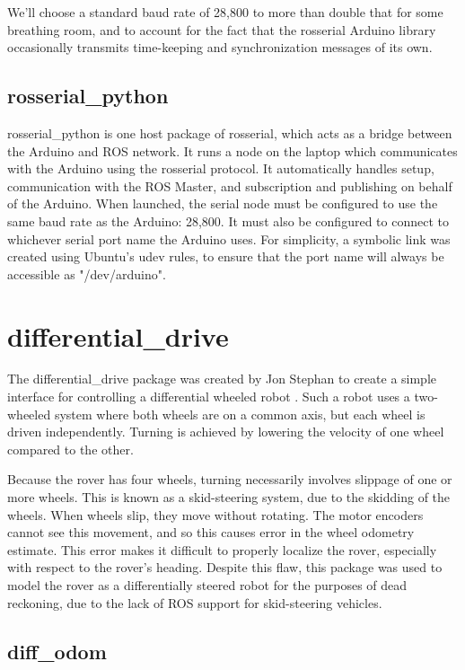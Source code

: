 We'll choose a standard baud rate of 28,800 to more than double that for some breathing room, and to account for the fact that the rosserial Arduino library occasionally transmits time-keeping and synchronization messages of its own.

\subsection{rosserial\_python}
rosserial\_python is one host package of rosserial, which acts as a bridge between the Arduino and ROS network. It runs a node on the laptop which communicates with the Arduino using the rosserial protocol. It automatically handles setup, communication with the ROS Master, and subscription and publishing on behalf of the Arduino. When launched, the serial node must be configured to use the same baud rate as the Arduino: 28,800. It must also be configured to connect to whichever serial port name the Arduino uses. For simplicity, a symbolic link was created using Ubuntu's udev rules, to ensure that the port name will always be accessible as "/dev/arduino". %

\section{differential\_drive}
The differential\_drive package was created by Jon Stephan to create a simple interface for controlling a differential wheeled robot \cite{differentialDrivePackage}. Such a robot uses a two-wheeled system where both wheels are on a common axis, but each wheel is driven independently. Turning is achieved by lowering the velocity of one wheel compared to the other.

Because the rover has four wheels, turning necessarily involves slippage of one or more wheels. This is known as a skid-steering system, due to the skidding of the wheels. When wheels slip, they move without rotating. The motor encoders cannot see this movement, and so this causes error in the wheel odometry estimate. This error makes it difficult to properly localize the rover, especially with respect to the rover's heading. Despite this flaw, this package was used to model the rover as a differentially steered robot for the purposes of dead reckoning, due to the lack of ROS support for skid-steering vehicles.

\subsection{diff\_odom} \label{sectionOdomPublishing}

